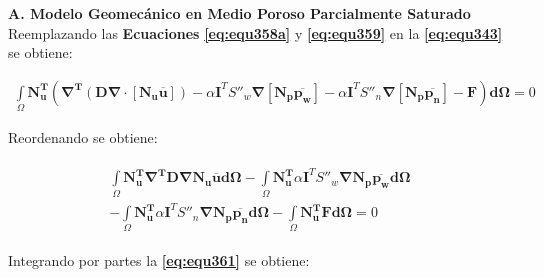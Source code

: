 \bigskip
\textbf{A. Modelo Geomecánico en Medio Poroso Parcialmente Saturado}\\
Reemplazando las \textbf{Ecuaciones} \textbf{\ref{eq:equ358a}} y \textbf{\ref{eq:equ359}} en la \textbf{\ref{eq:equ343}} se obtiene:\bigskip

\begin{ceqn} %
\begin{gather}\label{eq:equ360}
\int\limits_\Omega \mathbf{N_{u}^T}\left(\mathbf{\nabla^T}(\mathbf{D}\mathbf{\nabla}\cdot[\mathbf{N_u}\mathbf{\overline{u}}])-\alpha\mathbf{I}^TS''_w\mathbf{\nabla}[\mathbf{N_p}\mathbf{\overline{p_w}}] -\alpha\mathbf{I}^TS''_n\mathbf{\nabla}[\mathbf{N_p}\mathbf{\overline{p_n}}] - \mathbf{F}\right)\mathbf{d\Omega} = 0
\end{gather}   
\end{ceqn}
\bigskip
Reordenando se obtiene:

\begin{ceqn} %
\begin{gather}\label{eq:equ361}
\begin{multlined}
\int\limits_\Omega \mathbf{N_{u}^T}\mathbf{\nabla^T}\mathbf{D}\mathbf{\nabla}\mathbf{N_u}\mathbf{\overline{u}}\mathbf{d\Omega} - \int\limits_\Omega \mathbf{N_{u}^T} \alpha\mathbf{I}^TS''_w\mathbf{\nabla}\mathbf{N_p}\mathbf{\overline{p_w}}\mathbf{d\Omega}\\[12pt] -\int\limits_\Omega \mathbf{N_{u}^T} \alpha\mathbf{I}^TS''_n\mathbf{\nabla}\mathbf{N_p}\mathbf{\overline{p_n}}\mathbf{d\Omega} - \int\limits_\Omega \mathbf{N_{u}^T} \mathbf{F}\mathbf{d\Omega} = 0
\end{multlined}
\end{gather}   
\end{ceqn}

\bigskip
Integrando por partes la \textbf{\ref{eq:equ361}} se obtiene:\bigskip

